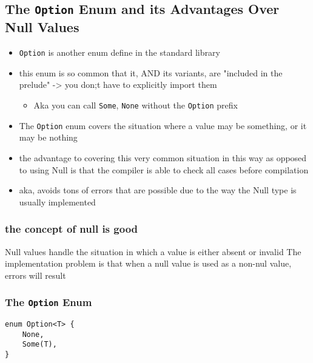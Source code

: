 \documentclass[11pt]{article}
\begin{document}
\subsection{The \texttt{Option} Enum and its Advantages Over Null Values}
\label{sec:orga75aff2}
\begin{itemize}
\item \texttt{Option} is another enum define in the standard library
\item this enum is so common that it, AND its variants, are "included in the prelude" -> you don;t have to explicitly import them
\begin{itemize}
\item Aka you can call \texttt{Some}, \texttt{None} without the \texttt{Option} prefix
\end{itemize}
\item The \texttt{Option} enum covers the situation where a value may be something, or it may be nothing
\item the advantage to covering this very common situation in this way as opposed to using Null is that the compiler is able to check all cases before compilation
\item aka, avoids tons of errors that are possible due to the way the Null type is usually implemented
\end{itemize}

\subsubsection{the concept of null is good}
\label{sec:org27cb604}
Null values handle the situation in which a value is either absent or invalid
The implementation problem is that when a null value is used as a non-nul value, errors will result

\subsubsection{The \texttt{Option} Enum}
\label{sec:orge607bef}
\begin{verbatim}
enum Option<T> {
    None,
    Some(T),
}
\end{verbatim}
\end{document}
